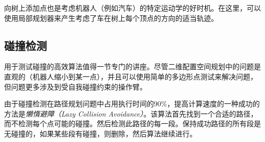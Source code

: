 向树上添加点也是考虑机器人（例如汽车）的特定运动学的好时机。在这里，可以使用局部规划器来产生考虑了车在树上每个顶点的方向的适当轨迹。


\subsection{碰撞检测}
用于测试碰撞的高效算法值得一节专门的讲座。尽管二维配置空间规划中的问题是直观的（机器人缩小到某一点），并且可以使用简单的多边形点测试来解决问题，但问题更多涉及到受自我碰撞约束的操作臂。


由于碰撞检测在路径规划问题中占用执行时间的$90\%$，提高计算速度的一种成功的方法是\emph{懒惰避障（Lazy Collision Avoidance）}。该算法首先找到一个合适的路径，而不检测每个点可能的碰撞。然后检测此路径的每一段。保持成功路径的所有段是无碰撞的，如果某些段有碰撞，则删除，然后算法继续进行。


